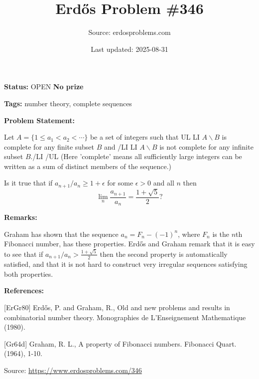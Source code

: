 \documentclass{article}
\title{Erd\H{o}s Problem \#346}
\date{Last updated: 2025-08-31}
\author{Source: erdosproblems.com}
\begin{document}
\maketitle

\noindent\textbf{Status:} OPEN \quad \textbf{No prize}

\noindent\textbf{Tags:} number theory, complete sequences

\medskip
\noindent\textbf{Problem Statement:}

Let $A=\{1\leq a_1< a_2<\cdots\}$ be a set of integers such that
{UL}
{LI} $A\backslash B$ is complete for any finite subset $B$ and {/LI}
{LI} $A\backslash B$ is not complete for any infinite subset $B$.{/LI}
{/UL}
(Here 'complete' means all sufficiently large integers can be written as a sum of distinct members of the sequence.)

Is it true that if $a_{n+1}/a_n \geq 1+\epsilon$ for some $\epsilon>0$ and all $n$ then\[\lim_n \frac{a_{n+1}}{a_n}=\frac{1+\sqrt{5}}{2}?\]

\bigskip
\noindent\textbf{Remarks:}

Graham \cite{Gr64d} has shown that the sequence $a_n=F_n-(-1)^{n}$, where $F_n$ is the $n$th Fibonacci number, has these properties. Erd\H{o}s and Graham \cite{ErGr80} remark that it is easy to see that if $a_{n+1}/a_n>\frac{1+\sqrt{5}}{2}$ then the second property is automatically satisfied, and that it is not hard to construct very irregular sequences satisfying both properties.

\bigskip
\noindent\textbf{References:}

[ErGr80] Erd\H{o}s, P. and Graham, R., Old and new problems and results in combinatorial number theory. Monographies de L'Enseignement Mathematique (1980).
 
 [Gr64d] Graham, R. L., A property of Fibonacci numbers. Fibonacci Quart. (1964), 1-10.

\bigskip
\noindent\small{Source: \url{https://www.erdosproblems.com/346}}
\end{document}
